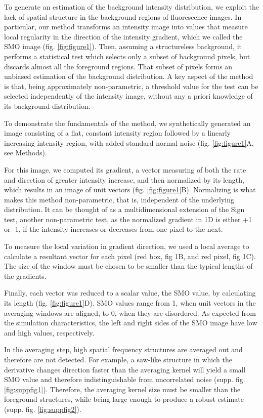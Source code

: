 \documentclass[article]{jss}
\begin{document}
    To generate an estimation of the background intensity distribution, we exploit the lack of spatial structure in the background regions of fluorescence images. In particular, our method transforms an intensity image into values that measure local regularity in the direction of the intensity gradient, which we called the SMO image (fig. \ref{fig:figure1}). Then, assuming a structureless background, it performs a statistical test which selects only a subset of background pixels, but discards almost all the foreground regions. That subset of pixels forms an unbiased estimation of the background distribution. A key aspect of the method is that, being approximately non-parametric, a threshold value for the test can be selected independently of the intensity image, without any a priori knowledge of its background distribution.
    
	To demonstrate the fundamentals of the method, we synthetically generated an image consisting of a flat, constant intensity region followed by a linearly increasing intensity region, with added standard normal noise (fig. \ref{fig:figure1}A, see Methods).

	For this image, we computed its gradient, a vector measuring of both the rate and direction of greater intensity increase, and then normalized by its length, which results in an image of unit vectors (fig. \ref{fig:figure1}B). Normalizing is what makes this method non-parametric, that is, independent of the underlying distribution. It can be thought of as a multidimensional extension of the Sign test, another non-parametric test, as the normalized gradient in 1D is either +1 or -1, if the intensity increases or decreases from one pixel to the next.

	To measure the local variation in gradient direction, we used a local average to calculate a resultant vector for each pixel (red box, fig 1B, and red pixel, fig 1C). The size of the window must be chosen to be smaller than the typical lengths of the gradients.

	Finally, each vector was reduced to a scalar value, the SMO value, by calculating its length (fig. \ref{fig:figure1}D). SMO values range from 1, when unit vectors in the averaging windows are aligned, to 0, when they are disordered. As expected from the simulation characteristics, the left and right sides of the SMO image have low and high values, respectively.

	In the averaging step, high spatial frequency structures are averaged out and therefore are not detected. For example, a saw-like structure in which the derivative changes direction faster than the averaging kernel will yield a small SMO value and therefore indistinguishable from uncorrelated noise (supp. fig. \ref{fig:suppfig1}). Therefore, the averaging kernel size must be smaller than the foreground structures, while being large enough to produce a robust estimate (supp. fig. \ref{fig:suppfig2}).
\end{document}
